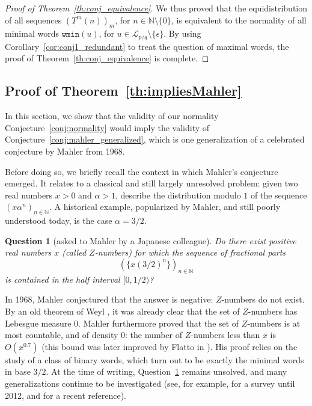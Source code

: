\documentclass{template_arxiv}
\newtheorem{question}[theorem]{Question}
\numberwithin{equation}{section}
\newcommand{\N}{\mathbb N}
\newcommand{\lan}{\mathcal{L}}
\newcommand{\eps}{\epsilon}
\newcommand{\wmin}{\mathtt{wmin}}
\begin{document}
\begin{proof}[Proof of Theorem~\ref{th:conj_equivalence}]
	We thus proved that the equidistribution of all sequences $(T^m(n))_m$, for $n \in \N\setminus\{0\}$, is equivalent to the normality of all minimal words $\wmin(u)$, for $u\in \lan_{p/q}\setminus\{\eps\}$. 
	By using Corollary~\ref{cor:conj1_redundant} to treat the question of maximal words, the proof of Theorem~\ref{th:conj_equivalence} is complete.
\end{proof}




\subsection{Proof of Theorem~\ref{th:impliesMahler}} \label{sssect:implies_mahler}

In this section, we show that the validity of our normality Conjecture~\ref{conj:normality} would imply the validity of Conjecture~\ref{conj:mahler_generalized}, which is one generalization of a celebrated conjecture by Mahler from 1968.


Before doing so, we briefly recall the context in which Mahler's conjecture emerged. 
It relates to a classical and still largely unresolved problem: given two real numbers $x > 0$ and $\alpha>1$,  describe the distribution modulo $1$ of the sequence 
$(x\alpha^n)_{n\in \N}$.
A historical example, popularized by Mahler, and still poorly understood today, is the case $\alpha = 3/2$.

\begin{question}[asked to Mahler by a Japanese colleague] \label{question:mahler} Do there exist positive real numbers $x$ (called \emph{$Z$-numbers}) for which the sequence of fractional parts
	\[(\{x(3/2)^n\})_{n\in \N}\]
	is contained in the half interval $[0,1/2)$?
\end{question}


In 1968, Mahler conjectured that the answer is negative: $Z$-numbers do not exist. 
By an old theorem of Weyl \cite{Wey16}, it was already clear that the set of $Z$-numbers has Lebesgue measure $0$. Mahler furthermore proved that the set of $Z$-numbers is at most countable, and of  density $0$: the number of $Z$-numbers less than $x$ is $O(x^{0.7})$ (this bound was later improved by Flatto in \cite{Fla92}). His proof relies on the study of a class of binary words, which turn out to be exactly the minimal words in base $3/2$. 
At the time of writing, Question~\ref{question:mahler} remains unsolved, and many generalizations continue to be investigated (see, for example, \cite[chapter 3]{Bug12} for a survey until 2012, and \cite{Dub19} for a recent reference). 
\end{document}
